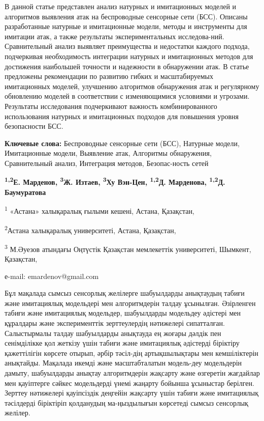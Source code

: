 В данной статье представлен анализ натурных и имитационных моделей и
алгоритмов выявления атак на беспроводные сенсорные сети (БСС). Описаны
разработанные натурные и имитационные модели, методы и инструменты для
имитации атак, а также результаты экспериментальных исследова-ний.
Сравнительный анализ выявляет преимущества и недостатки каждого подхода,
подчеркивая необходимость интеграции натурных и имитационных методов для
достижения наибольшей точности и надежности в обнаружении атак. В статье
предложены рекомендации по развитию гибких и масштабируемых имитационных
моделей, улучшению алгоритмов обнаружения атак и регулярному обновлению
моделей в соответствии с изменяющимися условиями и угрозами. Результаты
исследования подчеркивают важность комбинированного использования
натурных и имитационных подходов для повышения уровня безопасности БСС.

{\bfseries Ключевые слова:} Беспроводные сенсорные сети (БСС), Натурные
модели, Имитационные модели, Выявление атак, Алгоритмы обнаружения,
Сравнительный анализ, Интеграция методов, Безопас-ность сетей


\begin{center}
{\bfseries \textsuperscript{1,2}Е. Марденов\envelope,
\textsuperscript{3}Ж. Изтаев, \textsuperscript{3}Ху Вэн-Цен,
\textsuperscript{1,2}Д. Марденова, \textsuperscript{1,2}Д. Баумуратова}

\textsuperscript{1} «Астана» халықаралық ғылыми кешені, Астана,
Қазақстан,

\textsuperscript{2}Астана халықаралық университеті, Астана, Қазақстан,

\textsuperscript{3} М.Әуезов атындағы Оңтүстік Қазақстан мемлекеттік
университеті, Шымкент, Қазақстан,

е-mail: emardenov@gmail.com
\end{center}

Бұл мақалада сымсыз сенсорлық желілерге шабуылдарды анықтаудың табиғи
және имитациялық модельдері мен алгоритмдерін талдау ұсынылған.
Әзірленген табиғи және имитациялық модельдер, шабуылдарды модельдеу
әдістері мен құралдары және эксперименттік зерттеулердің нәтижелері
сипатталған. Салыстырмалы талдау шабуылдарды анықтауда ең жоғары дәлдік
пен сенімділікке қол жеткізу үшін табиғи және имитациялық әдістерді
біріктіру қажеттілігін көрсете отырып, әрбір тәсіл-дің артықшылықтары мен
кемшіліктерін анықтайды. Мақалада икемді және масштабталатын модель-деу
модельдерін дамыту, шабуылдарды анықтау алгоритмдерін жақсарту және
өзгеретін жағдайлар мен қауіптерге сәйкес модельдерді үнемі жаңарту
бойынша ұсыныстар берілген. Зерттеу нәтижелері қауіпсіздік деңгейін
жақсарту үшін табиғи және имитациялық тәсілдерді біріктіріп қолданудың
ма-ңыздылығын көрсетеді сымсыз сенсорлық желілер.

